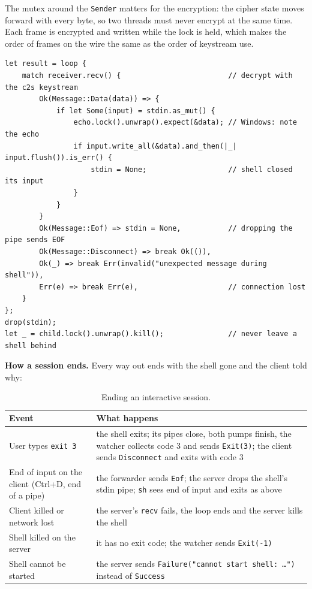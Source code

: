 The mutex around the \texttt{Sender} matters for the encryption: the cipher
state moves forward with every byte, so two threads must never encrypt at the
same time. Each frame is encrypted and written while the lock is held, which
makes the order of frames on the wire the same as the order of keystream use.

\begin{lstlisting}[caption={The server's input loop (\texttt{server/shell.rs}).}]
let result = loop {
    match receiver.recv() {                         // decrypt with the c2s keystream
        Ok(Message::Data(data)) => {
            if let Some(input) = stdin.as_mut() {
                echo.lock().unwrap().expect(&data); // Windows: note the echo
                if input.write_all(&data).and_then(|_| input.flush()).is_err() {
                    stdin = None;                   // shell closed its input
                }
            }
        }
        Ok(Message::Eof) => stdin = None,           // dropping the pipe sends EOF
        Ok(Message::Disconnect) => break Ok(()),
        Ok(_) => break Err(invalid("unexpected message during shell")),
        Err(e) => break Err(e),                     // connection lost
    }
};
drop(stdin);
let _ = child.lock().unwrap().kill();               // never leave a shell behind
\end{lstlisting}

\textbf{How a session ends.} Every way out ends with the shell gone and the
client told why:

\begin{table}[H]
\centering
\footnotesize
\begin{tabularx}{\textwidth}{@{}l X@{}}
\toprule
Event & What happens \\
\midrule
User types \texttt{exit 3} & the shell exits; its pipes close, both pumps finish, the watcher collects code 3 and sends \texttt{Exit(3)}; the client sends \texttt{Disconnect} and exits with code 3 \\
End of input on the client (Ctrl+D, end of a pipe) & the forwarder sends \texttt{Eof}; the server drops the shell's stdin pipe; \texttt{sh} sees end of input and exits as above \\
Client killed or network lost & the server's \texttt{recv} fails, the loop ends and the server kills the shell \\
Shell killed on the server & it has no exit code; the watcher sends \texttt{Exit(-1)} \\
Shell cannot be started & the server sends \texttt{Failure("cannot start shell: \ldots")} instead of \texttt{Success} \\
\bottomrule
\end{tabularx}
\caption{Ending an interactive session.}
\end{table}

